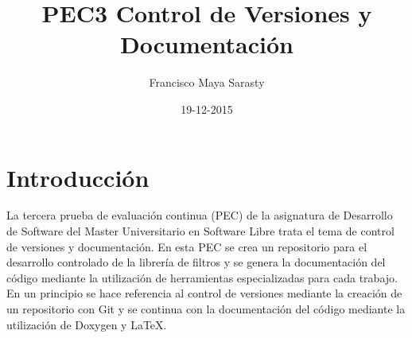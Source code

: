 \documentclass{article}
\title{PEC3 Control de Versiones y Documentación}
\author{Francisco Maya Sarasty}
\date{19-12-2015}
\begin{document}
  \maketitle
  \newpage

  \tableofcontents
  \newpage

  \section{Introducción}
  La tercera prueba de evaluación continua (PEC) de la asignatura de Desarrollo de Software del Master Universitario en Software Libre trata el tema de control de versiones y documentación. En esta PEC se crea un repositorio para el desarrollo controlado de la librería de filtros y se genera la documentación del código mediante la utilización de herramientas especializadas para cada trabajo.
  \newline
  \newline
  En un principio se hace referencia al control de versiones mediante la creación de un repositorio con Git y se continua con la documentación del código mediante la utilización de Doxygen y LaTeX.
  \newpage
\end{document}
